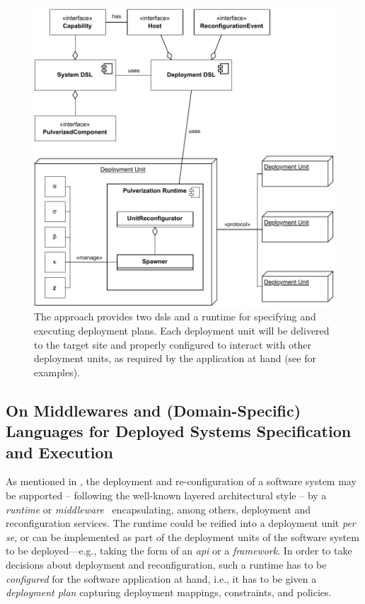 \documentclass[conference]{IEEEtran}
\begin{document}
\begin{figure}
\includegraphics[width=\columnwidth]{figures/pulverization-framework-overview.drawio.pdf}
\caption{The approach provides two \acp{dsl} and a runtime for specifying and executing deployment plans. Each deployment unit will be delivered to the target site and properly configured to interact with other deployment units, as required by the application at hand (see   for examples).}
\label{fig:approach}
\end{figure}



\subsection{On Middlewares and (Domain-Specific) Languages for Deployed Systems Specification and Execution}
\label{sec:contrib:general}

As mentioned in ,
 the deployment and re-configuration of a software system
 may be supported -- following the well-known layered architectural style -- by a \emph{runtime} or \emph{middleware}~\cite{DBLP:journals/cacm/GazisK22}
 encapsulating, among others, deployment and reconfiguration services.
%
The runtime could be reified into a deployment unit \emph{per se},
 or can be implemented as part of the deployment units of the software system to be deployed---e.g., taking the form of an \emph{\ac{api}} or a \emph{framework}.
%
In order to take decisions about deployment and reconfiguration, 
 such a runtime has to be \emph{configured}
 for the software application at hand,
 i.e., it has to be given a \emph{deployment plan} capturing deployment mappings, constraints, and policies.
%
\end{document}
